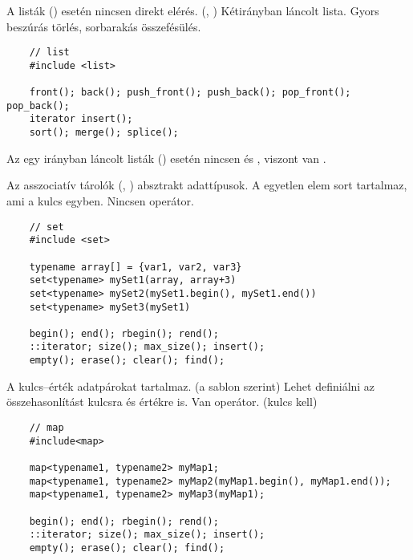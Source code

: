 \documentclass[main.tex]{subfiles}
\begin{document}
  A listák () esetén nincsen direkt elérés.
  (, \kkod{[]}) Kétirányban láncolt lista.
  Gyors beszúrás törlés, sorbarakás összefésülés.
  \begin{lstlisting}
    // list
    #include <list>

    front(); back(); push_front(); push_back(); pop_front(); pop_back();
    iterator insert();
    sort(); merge(); splice();
  \end{lstlisting}
 
  Az egy irányban láncolt listák ()
  esetén nincsen  és
  , viszont van
  .

  Az asszociatív tárolók (, )
  absztrakt adattípusok.
  A  egyetlen elem sort tartalmaz, ami a kulcs egyben.
  Nincsen \kkod{[]} operátor.
  \begin{lstlisting}
    // set
    #include <set>

    typename array[] = {var1, var2, var3}
    set<typename> mySet1(array, array+3)
    set<typename> mySet2(mySet1.begin(), mySet1.end())
    set<typename> mySet3(mySet1)

    begin(); end(); rbegin(); rend();
    ::iterator; size(); max_size(); insert();
    empty(); erase(); clear(); find();
  \end{lstlisting}

  A  kulcs–érték adatpárokat tartalmaz.
  (a  sablon szerint) Lehet definiálni az
  összehasonlítást kulcsra és értékre is.
  Van \kkod{[]} operátor. (kulcs kell)
  \begin{lstlisting}
    // map
    #include<map>

    map<typename1, typename2> myMap1;
    map<typename1, typename2> myMap2(myMap1.begin(), myMap1.end());
    map<typename1, typename2> myMap3(myMap1);

    begin(); end(); rbegin(); rend();
    ::iterator; size(); max_size(); insert();
    empty(); erase(); clear(); find();
  \end{lstlisting}

  
\end{document}
